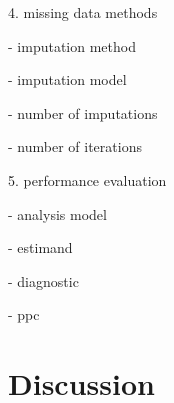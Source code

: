 \documentclass[bimj,fleqn]{w-art}
\theoremstyle{plain}
\theoremstyle{definition}
\begin{document}
4. missing data methods

- imputation method

- imputation model

- number of imputations

- number of iterations

5. performance evaluation

- analysis model

- estimand

- diagnostic

- ppc



\section{Discussion}


\begin{acknowledgement}
\end{acknowledgement}
\vspace*{1pc}



% 
% 




\end{document}

